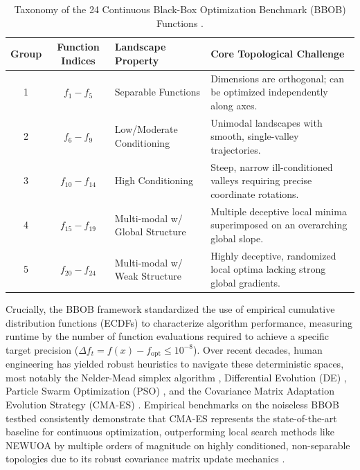 \begin{table}[htbp]
\centering
\caption{Taxonomy of the 24 Continuous Black-Box Optimization Benchmark (BBOB) Functions \cite{Hansen2010}.}
\label{tab:bbob_groups}
\small
\begin{tabularx}{\textwidth}{c c l X}
\toprule
\textbf{Group} & \textbf{Function Indices} & \textbf{Landscape Property} & \textbf{Core Topological Challenge} \\ 
\midrule
1 & $f_1 - f_5$   & Separable Functions               & Dimensions are orthogonal; can be optimized independently along axes. \\
2 & $f_6 - f_9$   & Low/Moderate Conditioning        & Unimodal landscapes with smooth, single-valley trajectories. \\
3 & $f_{10} - f_{14}$ & High Conditioning            & Steep, narrow ill-conditioned valleys requiring precise coordinate rotations. \\
4 & $f_{15} - f_{19}$ & Multi-modal w/ Global Structure & Multiple deceptive local minima superimposed on an overarching global slope. \\
5 & $f_{20} - f_{24}$ & Multi-modal w/ Weak Structure   & Highly deceptive, randomized local optima lacking strong global gradients. \\ 
\bottomrule
\end{tabularx}
\end{table}

Crucially, the BBOB framework standardized the use of empirical cumulative distribution functions (ECDFs) to characterize algorithm performance, measuring runtime by the number of function evaluations required to achieve a specific target precision ($\Delta f_t = f(x) - f_{\text{opt}} \le 10^{-8}$). Over recent decades, human engineering has yielded robust heuristics to navigate these deterministic spaces, most notably the Nelder-Mead simplex algorithm \cite{Nelder1965}, Differential Evolution (DE) \cite{Storn1997}, Particle Swarm Optimization (PSO) \cite{Kennedy1995}, and the Covariance Matrix Adaptation Evolution Strategy (CMA-ES) \cite{Hansen2001}. Empirical benchmarks on the noiseless BBOB testbed consistently demonstrate that CMA-ES represents the state-of-the-art baseline for continuous optimization, outperforming local search methods like NEWUOA \cite{Powell2006} by multiple orders of magnitude on highly conditioned, non-separable topologies due to its robust covariance matrix update mechanics \cite{Hansen2010}.

